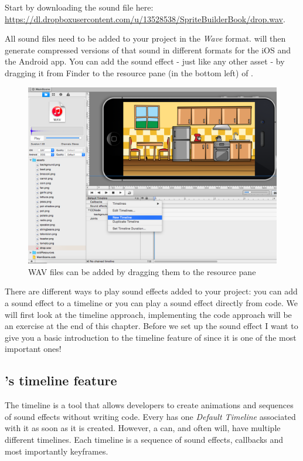 Start by downloading the sound file here:
\url{https://dl.dropboxusercontent.com/u/13528538/SpriteBuilderBook/drop.wav}.

All sound files need to be added to your \SB{} project in the \textit{Wave}
format. \SB{} will then generate compressed versions of that sound in different
formats for the iOS and the Android app. You can add the sound effect - just
like any other asset - by dragging it from Finder to the resource pane (in the
bottom left) of \SB{}.

\begin{figure}[H]
		\centering
		\includegraphics[width=0.9\linewidth]{images/Chapter2/new_timeline_audio.png}
		\caption{WAV files can be added by dragging them to the resource
		pane}\label{fig:audio_new_timeline}
\end{figure}

There are different ways to play sound effects added to your \SB{} project: you
can add a sound effect to a \SB{} timeline or you can play a sound effect
directly from code. We will first look at the timeline approach, implementing the code
approach will be an exercise at the end of this chapter. Before we set up the
sound effect I want to give you a basic introduction to the timeline feature
of \SB{} since it is one of the most important ones!

\subsection{\SB{}'s timeline feature}
The \SB{} timeline is a tool that allows developers to create animations and
sequences of sound effects without writing code. Every \ccbfile{} has one
\textit{Default Timeline} associated with it as soon as it is created. However,
a \ccbfile{} can, and often will, have multiple different timelines. Each
timeline is a sequence of sound effects, callbacks and most importantly
keyframes.

